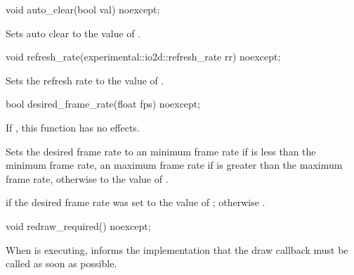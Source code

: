 \begin{itemdecl}
void auto_clear(bool val) noexcept;
\end{itemdecl}
\begin{itemdescr}
\pnum
\effects
Sets auto clear to the value of .
\end{itemdescr}

\begin{itemdecl}
void refresh_rate(experimental::io2d::refresh_rate rr) noexcept;
\end{itemdecl}
\begin{itemdescr}
\pnum
\effects
Sets the refresh rate to the value of .
\end{itemdescr}

\begin{itemdecl}
bool desired_frame_rate(float fps) noexcept;
\end{itemdecl}
\begin{itemdescr}
\pnum
\effects
If , this function has no effects.

\pnum
Sets the desired frame rate to an  minimum frame rate if  is less than the minimum frame rate, an  maximum frame rate if  is greater than the maximum frame rate, otherwise to the value of .

\pnum
\returns
{} if the desired frame rate was set to the value of ; otherwise .
\end{itemdescr}

\begin{itemdecl}
void redraw_required() noexcept;
\end{itemdecl}
\begin{itemdescr}
\pnum
\effects
When  is executing, informs the implementation that the draw callback must be called as soon as possible.
\end{itemdescr}

